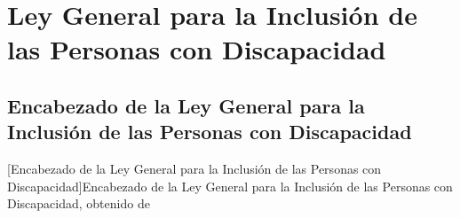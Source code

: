 


\appendix

\chapter[Anexo A. Ley General para la Inclusión de las Personas con Discapacidad]{Ley General para la Inclusión de las Personas con Discapacidad}
\label{anexo:ley_inclusion_disc}
\section{Encabezado de la Ley General para la Inclusión de las Personas con Discapacidad}

\begin{center}
    [Encabezado de la Ley General para la Inclusión de las Personas con Discapacidad]{Encabezado de la Ley General para la Inclusión de las Personas con Discapacidad, obtenido de \cite{ref34}}
\end{center}

